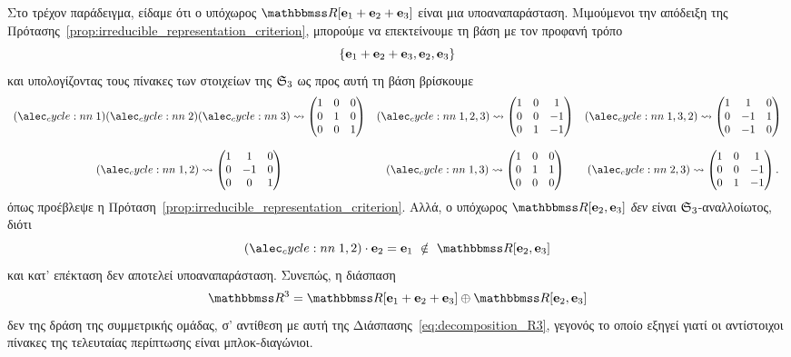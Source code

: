 \documentclass[12pt,a4paper,reqno]{amsart}
\begin{document}
Στο τρέχον παράδειγμα, είδαμε ότι ο υπόχωρος $\RR[\bfe_1+\bfe_2+\bfe_3]$ είναι μια υποαναπαράσταση. Μιμούμενοι την απόδειξη της Πρότασης~\ref{prop:irreducible_representation_criterion}, μπορούμε να επεκτείνουμε τη βάση με τον προφανή τρόπο
\[
\{\mathbf{e}_1+\mathbf{e}_2+\mathbf{e}_3, \mathbf{e}_2, \mathbf{e}_3\}
\]
και υπολογίζοντας τους πίνακες των στοιχείων της $\mathfrak{S}_3$ ως προς αυτή τη βάση βρίσκουμε 
\[
\begin{array}{ccc}
    \cycle{1}\cycle{2}\cycle{3} \rightsquigarrow 
    \begin{pmatrix} 
        1 & 0 & 0 \\ 
        0 & 1 & 0 \\ 
        0 & 0 & 1 
    \end{pmatrix}  
    & \cycle{1,2,3} \rightsquigarrow 
    \begin{pmatrix} 
        1 & 0 & 1 \\ 
        0 & 0 & -1 \\ 
        0 & 1 & -1 
    \end{pmatrix}
    & \cycle{1,3,2} \rightsquigarrow 
    \begin{pmatrix} 
        1 & 1  & 0 \\ 
        0 & -1 & 1 \\ 
        0 & -1 & 0
    \end{pmatrix} \\
     &  &  \\
    \cycle{1,2} \rightsquigarrow 
    \begin{pmatrix} 
        1 & 1  & 0 \\ 
        0 & -1 & 0 \\ 
        0 & 0  & 1 
    \end{pmatrix} 
    & \cycle{1,3} \rightsquigarrow 
    \begin{pmatrix} 
        1 & 0 & 0 \\ 
        0 & 1 & 1 \\ 
        0 & 0 & 0
    \end{pmatrix} 
    & \cycle{2,3} \rightsquigarrow 
    \begin{pmatrix} 
        1 & 0 & 1 \\ 
        0 & 0 & -1 \\ 
        0 & 1 & -1 
    \end{pmatrix}.
\end{array}
\]
όπως προέβλεψε η Πρόταση~\ref{prop:irreducible_representation_criterion}. Αλλά, ο υπόχωρος $\RR[\bfe_2,\bfe_3]$ \emph{δεν} είναι $\mathfrak{S}_3$-αναλλοίωτος, διότι 
\[
\cycle{1,2} \cdot \bfe_2 = \bfe_1 \ \notin \ \RR[\bfe_2, \bfe_3]
\]
και κατ' επέκταση δεν αποτελεί υποαναπαράσταση. Συνεπώς, η διάσπαση 
\[
\RR^3 = \RR[\bfe_1+\bfe_2+\bfe_3] \oplus \RR[\bfe_2,\bfe_3]
\]
δεν  της δράση της συμμετρικής ομάδας, σ' αντίθεση με αυτή της Διάσπασης~\eqref{eq:decomposition_R3}, γεγονός το οποίο εξηγεί γιατί οι αντίστοιχοι πίνακες της τελευταίας περίπτωσης είναι μπλοκ-διαγώνιοι.
\end{document}
